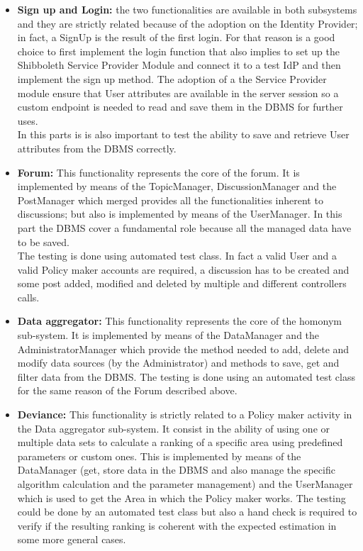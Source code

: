 \begin{itemize}
    \item \textbf{Sign up and Login:} the two functionalities are available in both subsystems and they are strictly related because of the adoption on the Identity Provider; in fact, a SignUp is the result of the first login. For that reason is a good choice to first implement the login function that also implies to set up the Shibboleth Service Provider Module and connect it to a test IdP and then implement the sign up method.
    The adoption of a the Service Provider module ensure that User attributes are available in the server session so a custom endpoint is needed to read and save them in the DBMS for further uses.\\
    In this parts is is also important to test the ability to save and retrieve User attributes from the DBMS correctly. 
    
    \item \textbf{Forum:} This functionality represents the core of the forum. It is implemented by means of the TopicManager, DiscussionManager and the PostManager which merged provides all the functionalities inherent to discussions; but also is implemented by means of the UserManager. In this part the DBMS cover a fundamental role because all the managed data have to be saved.\\
    The testing is done using automated test class. In fact a valid User and a valid Policy maker accounts are required, a discussion has to be created and some post added, modified and deleted by multiple and different controllers calls.
    
    \item \textbf{Data aggregator:} This functionality represents the core of the homonym sub-system. It is implemented by means of the DataManager and the AdministratorManager which provide the method needed to add, delete and modify data sources (by the Administrator) and methods to save, get and filter data from the DBMS.
    The testing is done using an automated test class for the same reason of the Forum described above.
    
    \item \textbf{Deviance:} This functionality is strictly related to a Policy maker activity in the Data aggregator sub-system. It consist in the ability of using one or multiple data sets to calculate a ranking of a specific area using predefined parameters or custom ones. This is implemented by means of the DataManager (get, store data in the DBMS and also manage the specific algorithm calculation and the parameter management) and the UserManager which is used to get the Area in which the Policy maker works. The testing could be done by an automated test class but also a hand check is required to verify if the resulting ranking is coherent with the expected estimation in some more general cases. 
    

\end{itemize}
